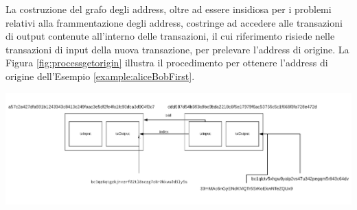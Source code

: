 La costruzione del grafo degli address, oltre ad essere insidiosa per i problemi relativi alla frammentazione degli address, costringe ad accedere alle transazioni di output contenute all’interno delle transazioni, il cui riferimento risiede nelle transazioni di input della nuova transazione, per prelevare l’address di origine.
La Figura \ref{fig:processgetorigin} illustra il procedimento per ottenere l’address di origine dell’Esempio \ref{example:aliceBobFirst}.

{\vspace{15pt}
\includegraphics[scale=0.25]{images/howFindTheAddressTo.png}
\vspace{10pt}
\par}

